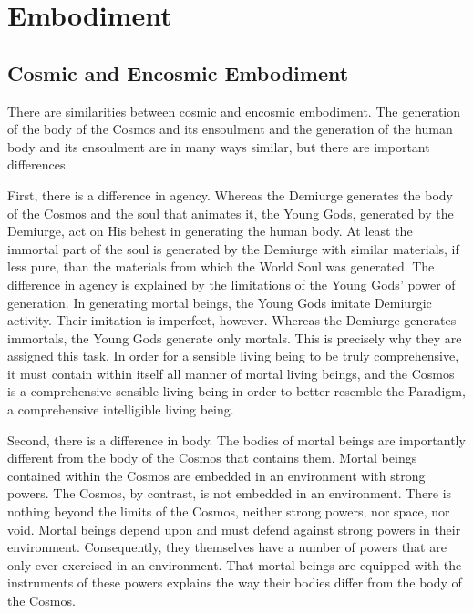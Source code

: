 \chapter{Embodiment} %
\label{cha:incarnation}

\section{Cosmic and Encosmic Embodiment} %
\label{sec:cosmic_and_encosmic_incarnation}

There are similarities between cosmic and encosmic embodiment. The generation of the body of the Cosmos and its ensoulment and the generation of the human body and its ensoulment are in many ways similar, but there are important differences. 

First, there is a difference in agency. Whereas the Demiurge generates the body of the Cosmos and the soul that animates it, the Young Gods, generated by the Demiurge, act on His behest in generating the human body. At least the immortal part of the soul is generated by the Demiurge with similar materials, if less pure, than the materials from which the World Soul was generated. The difference in agency is explained by the limitations of the Young Gods' power of generation. In generating mortal beings, the Young Gods imitate Demiurgic activity. Their imitation is imperfect, however. Whereas the Demiurge generates immortals, the Young Gods generate only mortals. This is precisely why they are assigned this task. In order for a sensible living being to be truly comprehensive, it must contain within itself all manner of mortal living beings, and the Cosmos is a comprehensive sensible living being in order to better resemble the Paradigm, a comprehensive intelligible living being. 

Second, there is a difference in body. The bodies of mortal beings are importantly different from the body of the Cosmos that contains them. Mortal beings contained within the Cosmos are embedded in an environment with strong powers. The Cosmos, by contrast, is not embedded in an environment. There is nothing beyond the limits of the Cosmos, neither strong powers, nor space, nor void. Mortal beings depend upon and must defend against strong powers in their environment. Consequently, they themselves have a number of powers that are only ever exercised in an environment. That mortal beings are equipped with the instruments of these powers explains the way their bodies differ from the body of the Cosmos. 

